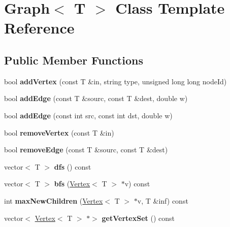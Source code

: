 \hypertarget{class_graph}{}\section{Graph$<$ T $>$ Class Template Reference}
\label{class_graph}
\subsection*{Public Member Functions}
\begin{DoxyCompactItemize}
\item 
\hypertarget{class_graph_a71bc98d8415ac258ecbe520beddf0615}{}\label{class_graph_a71bc98d8415ac258ecbe520beddf0615} 
bool {\bfseries add\+Vertex} (const T \&in, string type, unsigned long long node\+Id)
\item 
\hypertarget{class_graph_ac61af3aafe6277215f5a3b3cc7d58ce2}{}\label{class_graph_ac61af3aafe6277215f5a3b3cc7d58ce2} 
bool {\bfseries add\+Edge} (const T \&sourc, const T \&dest, double w)
\item 
\hypertarget{class_graph_ad30f780ecff925c7fcb607421bb805d4}{}\label{class_graph_ad30f780ecff925c7fcb607421bb805d4} 
bool {\bfseries add\+Edge} (const int src, const int dst, double w)
\item 
\hypertarget{class_graph_af9c903104ad69a7782979fa9caedf163}{}\label{class_graph_af9c903104ad69a7782979fa9caedf163} 
bool {\bfseries remove\+Vertex} (const T \&in)
\item 
\hypertarget{class_graph_a1106092a37366486cf55576f9ec01692}{}\label{class_graph_a1106092a37366486cf55576f9ec01692} 
bool {\bfseries remove\+Edge} (const T \&sourc, const T \&dest)
\item 
\hypertarget{class_graph_a911798b1a89f8c4ae90ba3eee849cff8}{}\label{class_graph_a911798b1a89f8c4ae90ba3eee849cff8} 
vector$<$ T $>$ {\bfseries dfs} () const
\item 
\hypertarget{class_graph_a56a5ea2c3aa7c0bd3849849be404a631}{}\label{class_graph_a56a5ea2c3aa7c0bd3849849be404a631} 
vector$<$ T $>$ {\bfseries bfs} (\hyperlink{class_vertex}{Vertex}$<$ T $>$ $\ast$v) const
\item 
\hypertarget{class_graph_a675559f8cddfe43bc416023ad9f28cfa}{}\label{class_graph_a675559f8cddfe43bc416023ad9f28cfa} 
int {\bfseries max\+New\+Children} (\hyperlink{class_vertex}{Vertex}$<$ T $>$ $\ast$v, T \&inf) const
\item 
\hypertarget{class_graph_a135e8f915af85904abca9eafaa4f13ce}{}\label{class_graph_a135e8f915af85904abca9eafaa4f13ce} 
vector$<$ \hyperlink{class_vertex}{Vertex}$<$ T $>$ $\ast$$>$ {\bfseries get\+Vertex\+Set} () const
$$
\end{DoxyCompactItemize}
